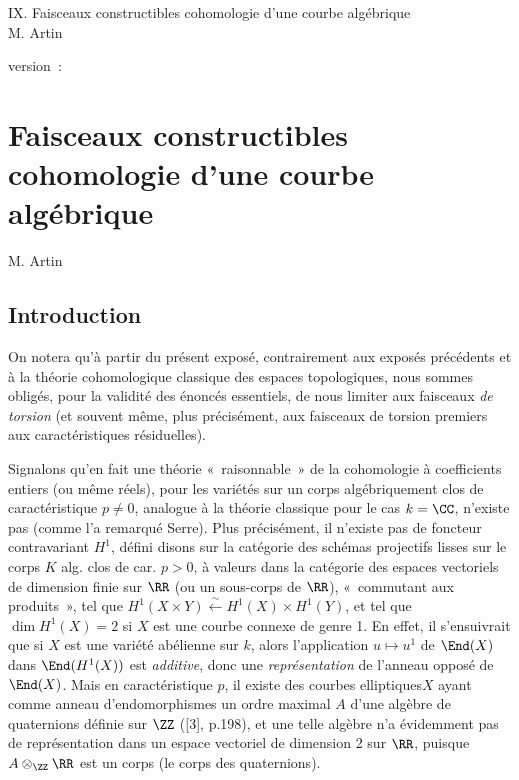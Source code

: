 \documentclass[10pt]{../fichiers-configuration-latex/smfart}
\begin{document}
\begin{center}
IX. Faisceaux constructibles cohomologie d'une courbe algébrique\\
M. Artin 
\end{center}

version : \showgitstatus{}
\tableofcontents

\else
\chapter{Faisceaux constructibles cohomologie d'une courbe algébrique}
\begin{center}
M. Artin 
\end{center}
\fi

\setcounter{pageoriginal}{0}

\setcounter{section}{-1}
\section{Introduction}\pageoriginale

On notera qu'à partir du présent exposé, contrairement aux exposés
précédents et à la théorie cohomologique classique des espaces
topologiques, nous sommes obligés, pour la validité des énoncés
essentiels, de nous limiter aux faisceaux \emph{de torsion} (et
souvent même, plus précisément, aux faisceaux de torsion premiers aux
caractéristiques résiduelles).

Signalons qu'en fait une théorie « raisonnable »  de la
cohomologie à coefficients entiers (ou même réels), pour les variétés
sur un corps algébriquement clos de caractéristique $p\neq 0$,
analogue à la théorie classique pour le cas
$k=\CC$, n'existe
pas (comme l'a remarqué Serre). Plus précisément, il n'existe pas de
foncteur contravariant $H^1$, défini disons sur la catégorie des
schémas projectifs lisses sur le corps $K$ alg. clos de car. $p> 0$, à
valeurs dans la catégorie des espaces vectoriels de dimension finie
sur $\RR$  (ou un sous-corps de $\RR$),
« commutant aux produits », \ie tel que $H^1(X\times
Y)\xleftarrow{\sim}H^1(X)\times H^1(Y)$, et tel que $\dim H^1(X)=2$ si
$X$ est une courbe connexe de genre 1. En effet, il s'ensuivrait que
si $X$ est une variété abélienne sur $k$, alors l'application
$u\mapsto u^1$ de $\End(X)$ dans $\End(H^1(X))$ est \emph{additive},
donc une \emph{représentation} de l'anneau opposé de $\End(X)$. Mais
en caractéristique $p$, il existe des courbes
elliptiques\pageoriginale $X$ ayant comme anneau d'endomorphismes un
ordre maximal $A$ d'une algèbre de quaternions définie sur
$\ZZ$ ([3], p.198), et une telle algèbre n'a
évidemment pas de représentation dans un espace vectoriel de dimension
2 sur $\RR$, puisque
$A\otimes_{\ZZ}\RR$ est un corps
(le corps des quaternions).
\end{document}
